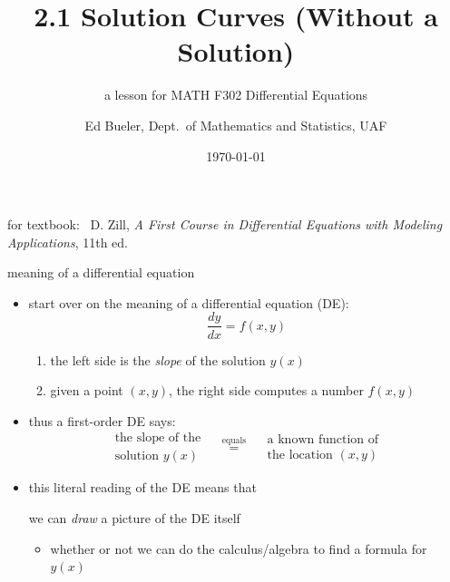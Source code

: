 \documentclass{beamer}
\title{2.1 Solution Curves (Without a Solution)}
\subtitle{a lesson for MATH F302 Differential Equations}
\author{Ed Bueler, Dept.~of Mathematics and Statistics, UAF}
\date{\tiny \today}
\begin{document}


\begin{frame}
\titlepage

\centerline{\tiny for textbook: \, D. Zill, \emph{A First Course in Differential Equations with Modeling Applications}, 11th ed.}
\end{frame}


\begin{frame}{meaning of a differential equation}

\begin{itemize}
\item start over on the meaning of a differential equation (DE):
    $$\frac{dy}{dx} = f(x,y)$$

\vspace{-2mm}
    \begin{enumerate}
    \item the left side is the \emph{slope} of the solution $y(x)$
    \item given a point $(x,y)$, the right side computes a number $f(x,y)$
    \end{enumerate}
\item thus a first-order DE says:
    $$\begin{matrix}
    \text{the slope of the} \\
    \text{solution } y(x) 
    \end{matrix} \quad \stackrel{\text{equals}}{=} \quad
    \begin{matrix}
    \text{a known function of} \\
    \text{the location } (x,y)
    \end{matrix}$$
\item this literal reading of the DE means that

\centerline{\alert{we can \emph{draw} a picture of the DE itself}}

    \begin{itemize}
    \item whether or not we can do the calculus/algebra to find a formula for $y(x)$
    \end{itemize}
\end{itemize}
\end{frame}
\end{document}

